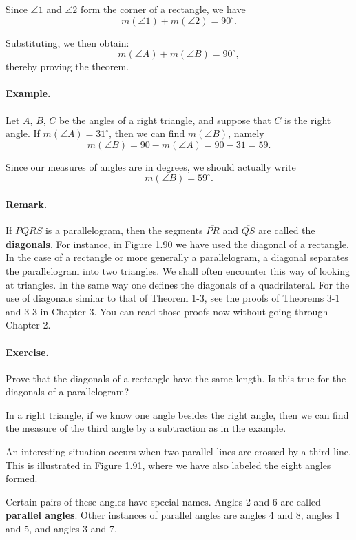 \documentclass[12pt]{book} %
\begin{document}
Since $\angle 1$ and $\angle 2$ form the corner of a rectangle, we have
\[
m(\angle 1)+m(\angle 2)=90^\circ.
\]

Substituting, we then obtain:
\[
m(\angle A)+m(\angle B)=90^\circ,
\]
thereby proving the theorem.

\paragraph{Example.}
Let $A$, $B$, $C$ be the angles of a right triangle, and suppose that $C$ is the right angle. If $m(\angle A)=31^\circ$, then we can find $m(\angle B)$, namely
\[
m(\angle B)=90-m(\angle A)=90-31=59.
\]

Since our measures of angles are in degrees, we should actually write
\[
m(\angle B)=59^\circ.
\]

\paragraph{Remark.}
If $PQRS$ is a parallelogram, then the segments $\overline{PR}$ and $\overline{QS}$ are called the \textbf{diagonals}. For instance, in Figure 1.90 we have used the diagonal of a rectangle. In the case of a rectangle or more generally a parallelogram, a diagonal separates the parallelogram into two triangles. We shall often encounter this way of looking at triangles. In the same way one defines the diagonals of a quadrilateral. For the use of diagonals similar to that of Theorem 1-3, see the proofs of Theorems 3-1 and 3-3 in Chapter 3. You can read those proofs now without going through Chapter 2.

\paragraph{Exercise.}
Prove that the diagonals of a rectangle have the same length. Is this true for the diagonals of a parallelogram?

In a right triangle, if we know one angle besides the right angle, then we can find the measure of the third angle by a subtraction as in the example.

An interesting situation occurs when two parallel lines are crossed by a third line. This is illustrated in Figure 1.91, where we have also labeled the eight angles formed.


Certain pairs of these angles have special names. Angles 2 and 6 are called \textbf{parallel angles}. Other instances of parallel angles are angles 4 and 8, angles 1 and 5, and angles 3 and 7.
\end{document}
